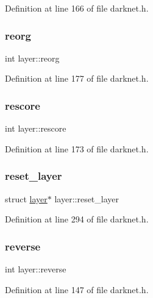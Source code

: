 Definition at line 166 of file darknet.\+h.

\mbox{\label{structlayer_a13f7dcacfefce8f8f5694dad9e5aa6ae}} 
\subsubsection{\texorpdfstring{reorg}{reorg}}
{\footnotesize\ttfamily int layer\+::reorg}



Definition at line 177 of file darknet.\+h.

\mbox{\label{structlayer_a662867ba4218e923a302fd215dab2ddd}} 
\subsubsection{\texorpdfstring{rescore}{rescore}}
{\footnotesize\ttfamily int layer\+::rescore}



Definition at line 173 of file darknet.\+h.

\mbox{\label{structlayer_a091a5757286a08a99ee76cd332ae8631}} 
\subsubsection{\texorpdfstring{reset\_layer}{reset\_layer}}
{\footnotesize\ttfamily struct \mbox{\hyperlink{structlayer}{layer}}$\ast$ layer\+::reset\+\_\+layer}



Definition at line 294 of file darknet.\+h.

\mbox{\label{structlayer_abf6e12515b8a316fb280c43234701022}} 
\subsubsection{\texorpdfstring{reverse}{reverse}}
{\footnotesize\ttfamily int layer\+::reverse}



Definition at line 147 of file darknet.\+h.

